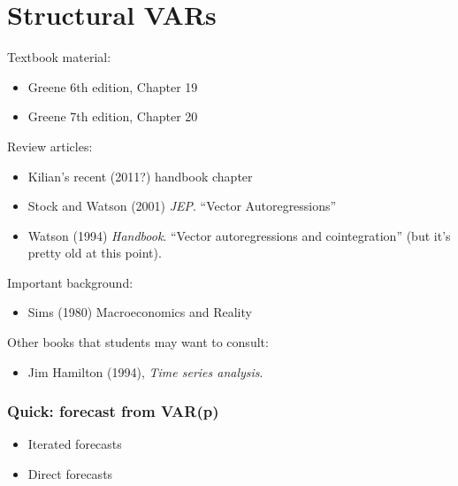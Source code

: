 

\part*{Structural VARs}

Textbook material:
\begin{itemize}
\item Greene 6th edition, Chapter 19
\item Greene 7th edition, Chapter 20
\end{itemize}
Review articles:
\begin{itemize}
\item Kilian's recent (2011?) handbook chapter
\item Stock and Watson (2001) \emph{JEP}. ``Vector Autoregressions''
\item Watson (1994) \emph{Handbook}. ``Vector autoregressions and
  cointegration'' (but it's pretty old at this point).
\end{itemize}
Important background:
\begin{itemize}
\item Sims (1980) Macroeconomics and Reality
\end{itemize}
Other books that students may want to consult:
\begin{itemize}
\item Jim Hamilton (1994), \emph{Time series analysis}.
\end{itemize}

\section{Quick: forecast from VAR(p)}

\begin{itemize}
\item Iterated forecasts
\item Direct forecasts
\end{itemize}

